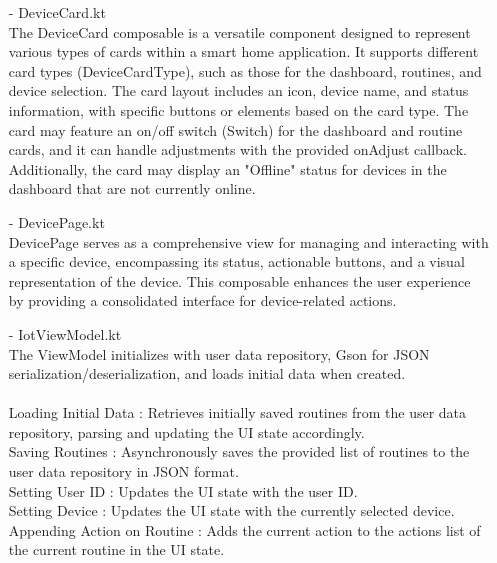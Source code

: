 \begin{enumerate}
                        \item[-] DeviceCard.kt \\
                              The DeviceCard composable is a versatile component designed to represent various types of cards within a smart home application. It supports different card types (DeviceCardType), such as those for the dashboard, routines, and device selection. The card layout includes an icon, device name, and status information, with specific buttons or elements based on the card type. The card may feature an on/off switch (Switch) for the dashboard and routine cards, and it can handle adjustments with the provided onAdjust callback. Additionally, the card may display an "Offline" status for devices in the dashboard that are not currently online.\\
                        \item[-] DevicePage.kt \\
                              DevicePage serves as a comprehensive view for managing and interacting with a specific device, encompassing its status, actionable buttons, and a visual representation of the device. This composable enhances the user experience by providing a consolidated interface for device-related actions.\\
                        \item[-] IotViewModel.kt \\
                              The ViewModel initializes with user data repository, Gson for JSON serialization/deserialization, and loads initial data when created.\\\\
                              Loading Initial Data : Retrieves initially saved routines from the user data repository, parsing and updating the UI state accordingly.\\

                              Saving Routines : Asynchronously saves the provided list of routines to the user data repository in JSON format.\\

                              Setting User ID : Updates the UI state with the user ID.\\

                              Setting Device : Updates the UI state with the currently selected device.\\

                              Appending Action on Routine : Adds the current action to the actions list of the current routine in the UI state.\\


\end{enumerate}
